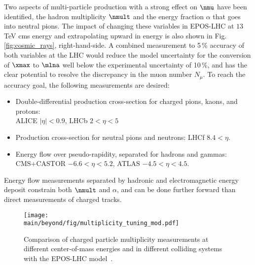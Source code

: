 \documentclass[../report.tex]{subfiles}
\providecommand{\main}{..}
\begin{document}


Two aspects of multi-particle production with a strong effect on $\nmu$ have been identified\cite{Ulrich:2010rg}, the hadron multiplicity $\nmult$ and the energy fraction $\alpha$ that goes into neutral pions. The impact of changing these variables in EPOS-LHC at $13$\,TeV cms energy and extrapolating upward in energy is also shown in Fig.\ref{fig:cosmic_rays}, right-hand-side. A combined measurement to 5\,\% accuracy of both variables at the LHC would reduce the model uncertainty for the conversion of $\xmax$ to $\mlna$ well below the experimental uncertainty of 10\,\%, and has the clear potential to resolve the discrepancy in the muon number $N_\mu$. To reach the accuracy goal, the following measurements are desired:
\begin{itemize}
\item Double-differential production cross-section for charged pions, kaons, and protons: \\ ALICE $|\eta| < 0.9$, LHCb $2 < \eta < 5$
\item Production cross-section for neutral pions and neutrons: LHCf $8.4 < \eta$.
\item Energy flow over pseudo-rapidity, separated for hadrons and gammas:\\ CMS+CASTOR $-6.6 < \eta < 5.2$, ATLAS $-4.5 < \eta < 4.5$.
\end{itemize}
Energy flow measurements separated by hadronic and electromagnetic energy deposit constrain both $\nmult$ and $\alpha$, and can be done further forward than direct measurements of charged tracks.

\begin{figure}
\texttt{[image: \\main/beyond/fig/multiplicity\_tuning\_mod.pdf]}
\caption{Comparison of charged particle multiplicity measurements at different center-of-mass energies and in different colliding systems with the EPOS-LHC model~\cite{Kim:2018ink}.}
\label{fig:multiplicity_tuning}
\end{figure}
\end{document}
